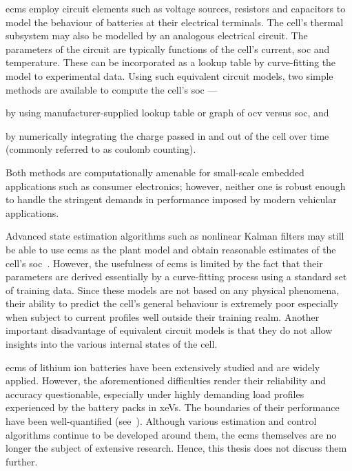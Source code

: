 \glspl{ecm}  employ circuit  elements  such as  voltage  sources, resistors  and
capacitors to  model the behaviour  of batteries at their  electrical terminals.
The cell's  thermal subsystem may  also be  modelled by an  analogous electrical
circuit. The  parameters of the  circuit are  typically functions of  the cell's
current, \gls{soc} and  temperature. These can be incorporated as  a lookup table by
curve-fitting  the model  to experimental  data. Using  such equivalent  circuit
models, two simple methods are available to compute the cell's \gls{soc} ---
\begin{enumerate*}[label=\itshape\alph*\upshape)]
    \item by using manufacturer-supplied  lookup table or graph of \gls{ocv} versus \gls{soc}, and
    \item by numerically integrating the charge passed in and out of the cell over time (commonly referred to as coulomb counting).
\end{enumerate*}
Both methods are computationally  amenable for small-scale embedded applications
such as  consumer electronics; however, neither  one is robust enough  to handle
the stringent demands in performance imposed by modern vehicular applications.

Advanced state estimation algorithms such  as nonlinear Kalman filters may still
be able to use \glspl{ecm} as the plant model and obtain reasonable estimates of
the  cell's  \gls{soc}~\cite{Plett2006,  Sun2011}. However,  the  usefulness  of
\glspl{ecm} is limited by the fact that their parameters are derived essentially
by a  curve-fitting process using a  standard set of training  data. Since these
models are  not based on  any physical phenomena,  their ability to  predict the
cell's general behaviour  is extremely poor especially when  subject to current
profiles well  outside their training  realm. Another important  disadvantage of
equivalent circuit  models is that they  do not allow insights  into the various
internal states of the cell.

\glspl{ecm}  of  lithium  ion  batteries   have  been  extensively  studied  and
are  widely  applied.  However,  the aforementioned  difficulties  render  their
reliability and  accuracy questionable,  especially under highly  demanding load
profiles  experienced by  the battery  packs in  \glspl{xeV}. The  boundaries of
their  performance have  been well-quantified  (see~\cite{Plett2015,Plett2016}).
Although  various estimation  and control  algorithms continue  to be  developed
around them, the  \glspl{ecm} themselves are no longer the  subject of extensive
research. Hence, this thesis does not discuss them further.

